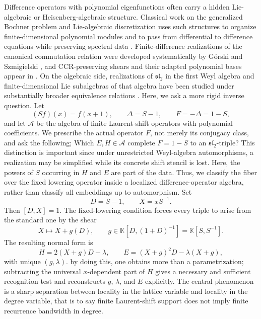 \documentclass[11pt,reqno]{amsart}
\numberwithin{equation}{section}
\theoremstyle{definition}
\theoremstyle{remark}
\newcommand{\K}{\mathbb K}
\newcommand{\algA}{\mathcal A}
\begin{document}
Difference operators with polynomial eigenfunctions often carry a hidden Lie-algebraic or Heisenberg-algebraic structure.  Classical work on the generalized Bochner problem and Lie-algebraic discretization uses such structures to organize finite-dimensional polynomial modules and to pass from differential to difference equations while preserving spectral data \cite{Turbiner1992,Turbiner1993,SmirnovTurbiner1995,SmirnovTurbiner1996}.  Finite-difference realizations of the canonical commutation relation were developed systematically by G\'orski and Szmigielski \cite{GorskiSzmigielski1998,GorskiSzmigielski2000}, and CCR-preserving shears and their adapted polynomial bases appear in \cite{ChryssomalakosTurbiner2001,DimakisMullerHoissenStriker1996,LeviTempestaWinternitz2004}.  On the algebraic side, realizations of $\mathfrak{sl}_2$ in the first Weyl algebra and finite-dimensional Lie subalgebras of that algebra have been studied under substantially broader equivalence relations \cite{Dixmier1968,Joseph1974,RauschSlupinskiTanasa2006}. Here, we ask a more rigid inverse question.  Let
\[
 (Sf)(x)=f(x+1),
 \qquad
 \Delta=S-1,
 \qquad
 F=-\Delta=1-S,
\]
and let $\algA$ be the algebra of finite Laurent-shift operators with polynomial coefficients.  We prescribe the actual operator $F$, not merely its conjugacy class, and ask the following; Which $E,H\in\algA$ complete $F=1-S$ to an $\mathfrak{sl}_2$-triple? This distinction is important since under unrestricted Weyl-algebra automorphisms, a realization may be simplified while its concrete shift stencil is lost.  Here, the powers of $S$ occurring in $H$ and $E$ are part of the data.  Thus, we classify the fiber over the fixed lowering operator inside a localized difference-operator algebra, rather than classify all embeddings up to automorphism. Set
\[
 D=S-1,
 \qquad
 X=xS^{-1}.
\]
Then $[D,X]=1$.  The fixed-lowering condition forces every triple to arise from the standard one by the shear
\[
 X\longmapsto X+g(D),
 \qquad
 g\in\K[D,(1+D)^{-1}]=\K[S,S^{-1}].
\]
The resulting normal form is
\begin{equation}\label{eq:intro-normal-form}
 H=2(X+g)D-\lambda,
 \qquad
 E=(X+g)^2D-\lambda(X+g),
\end{equation}
with unique $(g,\lambda)$. by doing this, one obtains more than a parametrization;  subtracting the universal $x$-dependent part of $H$ gives a necessary and sufficient recognition test and reconstructs $g$, $\lambda$, and $E$ explicitly. The central phenomenon is a sharp separation between locality in the lattice variable and locality in the degree variable, that is to say finite Laurent-shift support does not imply finite recurrence bandwidth in degree. 
\end{document}
